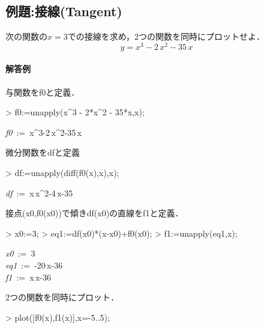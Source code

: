 \subsection{例題:接線(Tangent)}
次の関数の$\displaystyle x=3$での接線を求め，2つの関数を同時にプロットせよ．
\begin{equation*}
y={x}^{3}-2\,{x}^{2}-35\,x
\end{equation*}

\paragraph{解答例}
与関数をf0と定義．
\begin{MapleInput}
> f0:=unapply(x^3 - 2*x^2 - 35*x,x);
\end{MapleInput}
\begin{MapleOutput}
{\it f0}\, := \,x^{3}-2\,{x}^{2}-35\,x
\end{MapleOutput}
微分関数をdfと定義
\begin{MapleInput}
> df:=unapply(diff(f0(x),x),x);
\end{MapleInput}
\begin{MapleOutput}
{\it df}\, := \,x\,{x}^{2}-4\,x-35
\end{MapleOutput}
接点(x0,f0(x0))で傾きdf(x0)の直線をf1と定義．
\begin{MapleInput}
> x0:=3;
> eq1:=df(x0)*(x-x0)+f0(x0);
> f1:=unapply(eq1,x);
\end{MapleInput}
\begin{MapleOutputGather}
{\it x0}\, := \,3 \notag \\
{\it eq1}\, := \,-20\,x-36 \notag \\
{\it f1}\, := \,x\,x-36 \notag
\end{MapleOutputGather}
2つの関数を同時にプロット．
\begin{MapleInput}
> plot([f0(x),f1(x)],x=-5..5);
\end{MapleInput}
